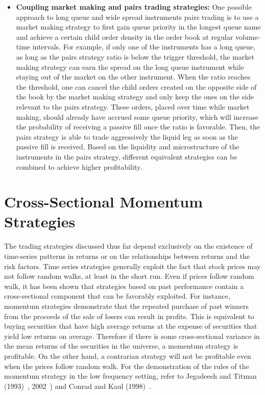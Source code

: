 \begin{itemize}
\item \textbf{Coupling market making and pairs trading strategies:} One possible approach to long queue and wide spread instruments pairs trading is to use a market making strategy to first gain queue priority in the longest queue name and achieve a certain child order density in the order book at regular volume-time intervals. For example, if only one of the instruments has a long queue, as long as the pairs strategy ratio is below the trigger threshold, the market making strategy can earn the spread on the long queue instrument while staying out of the market on the other instrument. When the ratio reaches the threshold, one can cancel the child orders created on the opposite side of the book by the market making strategy and only keep the ones on the side relevant to the pairs strategy. These orders, placed over time while market making, should already have accrued some queue priority, which will increase the probability of receiving a passive fill once the ratio is favorable. Then, the pairs strategy is able to trade aggressively the liquid leg as soon as the passive fill is received. Based on the liquidity and microstructure of the instruments in the pairs strategy, different equivalent strategies can be combined to achieve higher profitability.
\end{itemize}



\section{Cross-Sectional Momentum Strategies}


The trading strategies discussed thus far depend exclusively on the existence of time-series patterns in returns or on the relationships between returns and the risk factors. Time series strategies generally exploit the fact that stock prices may not follow random walks, at least in the short run. Even if prices follow random walk, it has been shown that strategies based on past performance contain a cross-sectional component that can be favorably exploited. For instance, momentum strategies demonstrate that the repeated purchase of past winners from the proceeds of the sale of losers can result in profits. This is equivalent to buying securities that have high average returns at the expense of securities that yield low returns on average. Therefore if there is some cross-sectional variance in the mean returns of the securities in the universe, a momentum strategy is profitable. On the other hand, a contrarian strategy will not be profitable even when the prices follow random walk. For the demonstration of the rules of the momentum strategy in the low frequency setting, refer to Jegadeesh and Titman (1993)~\cite{JeTit1993}, 2002~\cite{JeTit}) and Conrad and Kaul (1998)~\cite{conrad1998}.


